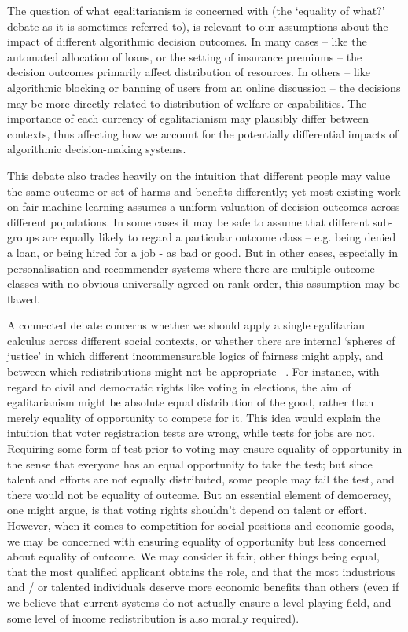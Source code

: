 \documentclass[pmlr,twocolumn,10pt]{jmlr}%
\begin{document}
The question of what egalitarianism is concerned with (the `equality of what?' debate as it is sometimes referred to), is relevant to our assumptions about the impact of different algorithmic decision outcomes. In many cases -- like the automated allocation of loans, or the setting of insurance premiums -- the decision outcomes primarily affect distribution of resources. In others -- like algorithmic blocking or banning of users from an online discussion -- the decisions may be more directly related to distribution of welfare or capabilities. The importance of each currency of egalitarianism may plausibly differ between contexts, thus affecting how we account for the potentially differential impacts of algorithmic decision-making systems.

This debate also trades heavily on the intuition that different people may value the same outcome or set of harms and benefits differently; yet most existing work on fair machine learning assumes a uniform valuation of decision outcomes across different populations. In some cases it may be safe to assume that different sub-groups are equally likely to regard a particular outcome class -- e.g. being denied a loan, or being hired for a job - as bad or good. But in other cases, especially in personalisation and recommender systems where there are multiple outcome classes with no obvious universally agreed-on rank order, this assumption may be flawed.

A connected debate concerns whether we should apply a single egalitarian calculus across different social contexts, or whether there are internal `spheres of justice' in which different incommensurable logics of fairness might apply, and between which redistributions might not be appropriate ~\cite{walzer2008spheres}. For instance, with regard to civil and democratic rights like voting in elections, the aim of egalitarianism might be absolute equal distribution of the good, rather than merely equality of opportunity to compete for it. This idea would explain the intuition that voter registration tests are wrong, while tests for jobs are not. Requiring some form of test prior to voting may ensure equality of opportunity in the sense that everyone has an equal opportunity to take the test; but since talent and efforts are not equally distributed, some people may fail the test, and there would not be equality of outcome. But an essential element of democracy, one might argue, is that voting rights shouldn't depend on talent or effort. However, when it comes to competition for social positions and economic goods, we may be concerned with ensuring equality of opportunity but less concerned about equality of outcome. We may consider it fair, other things being equal, that the most qualified applicant obtains the role, and that the most industrious and / or talented individuals deserve more economic benefits than others (even if we believe that current systems do not actually ensure a level playing field, and some level of income redistribution is also morally required).
\end{document}
